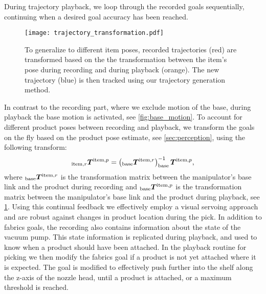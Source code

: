 During trajectory playback, we loop through the recorded goals sequentially, continuing when a desired goal accuracy has been reached. 
\begin{figure}[h]
  \centering
  \texttt{[image: trajectory\_transformation.pdf]}
  \caption{To generalize to different item poses, recorded
  trajectories (red) are transformed based on the the
  transformation between the item's pose during recording
  and during playback (orange). The new trajectory (blue) is then
  tracked using our trajectory generation method.
  }
  \label{fig:transformation_trajectory}
\end{figure}
%
In contrast to the recording part, where we exclude motion
of the base, during playback the base motion is activated,
see \cref{fig:base_motion}. To account for different product
poses between recording and playback, we transform the goals
on the fly based on the product pose estimate, see
\cref{sec:perception}, using the following transform:
\[
  _{\textrm{item},r}\bm{T}^{\textrm{item},p} =
  \left(_{\textrm{base}}\bm{T}^{\textrm{item},r}\right)^{-1}_{\textrm{base}}\bm{T}^{\textrm{item},p},
\]
where $_{\textrm{base}}\bm{T}^{\textrm{item},r}$ is the transformation matrix
between the manipulator's base link and the product during
recording and $_{\textrm{base}}\bm{T}^{\textrm{item},p}$ is the
transformation matrix between the manipulator's base link and
the product during playback, see
\cref{fig:transformation_trajectory}.
Using this continual feedback we effectively employ a visual servoing \cite{kmich2022image} approach and are robust against changes in product location during the pick.
In addition to \ac{fabrics} goals, the recording also contains information about the state of the vacuum pump. This state information is replicated during playback, and used to know when a product should have been attached.
In the playback routine for picking we then modify the fabrics goal if a product is not yet attached where it is expected. The goal is modified to effectively push further into the shelf along the z-axis of the nozzle head, until a product is attached, or a maximum threshold is reached.
